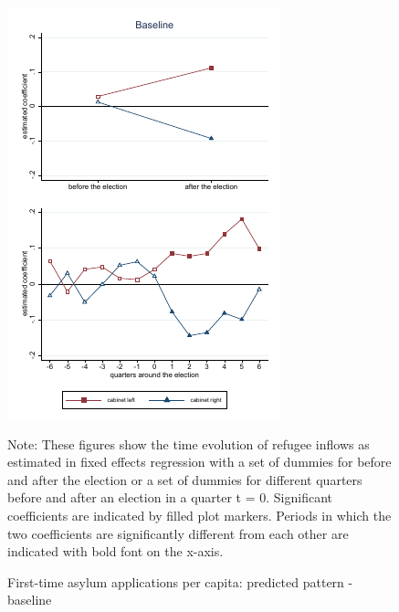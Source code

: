\documentclass[11pt,a4paper]{scrartcl}
\begin{document}
\clearpage
\FloatBarrier
\begin{figure}[!ht]
	
	\caption{First-time asylum applications per capita: predicted pattern - baseline}
	\centering
	\begin{minipage}{0.8\textwidth} 
		\includegraphics[width=\linewidth]{../results/applications/app_graphs_baseline.pdf}
		{\scriptsize Note: These figures show the time evolution of refugee inflows as estimated in fixed effects regression with a set of dummies for before and after the election or a set of dummies for different quarters before and after an election in a quarter t = 0. Significant coefficients are indicated by filled plot markers. Periods in which the two coefficients are significantly different from each other are indicated with bold font on the x-axis.\par}
	\end{minipage}
\end{figure}
\end{document}
